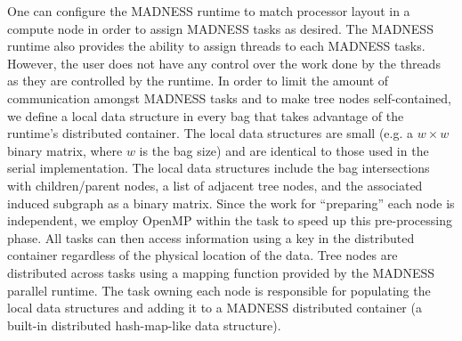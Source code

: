 \documentclass[conference]{IEEEtran}
\begin{document}
One can configure the MADNESS runtime to match processor layout in a compute node
in order to assign MADNESS tasks as desired.
The MADNESS runtime also provides the ability to assign threads to each MADNESS tasks. 
However, the user does not have any control over the work done by the threads 
as they are controlled by the runtime.
In order to limit the amount of communication amongst MADNESS tasks and to make tree nodes
self-contained, we define a local data structure in every bag that takes advantage of the
runtime's distributed container.
The local data structures are small (e.g. a $w\times w$ binary matrix, where $w$ is the bag size) 
and are identical to those used in the serial implementation. The local data structures
include the bag intersections with children/parent nodes, a list of adjacent tree nodes, and the associated induced subgraph as a binary matrix.  
Since the work for ``preparing'' each node is independent, we employ OpenMP within the task to speed up this pre-processing phase. All tasks can then access information using a key in the distributed container regardless of the physical location of the data. Tree nodes are distributed across tasks using a mapping function provided by the MADNESS parallel runtime. The task owning each node is responsible for populating the local data structures and adding it to a MADNESS distributed container (a built-in distributed hash-map-like data structure).

\end{document}
